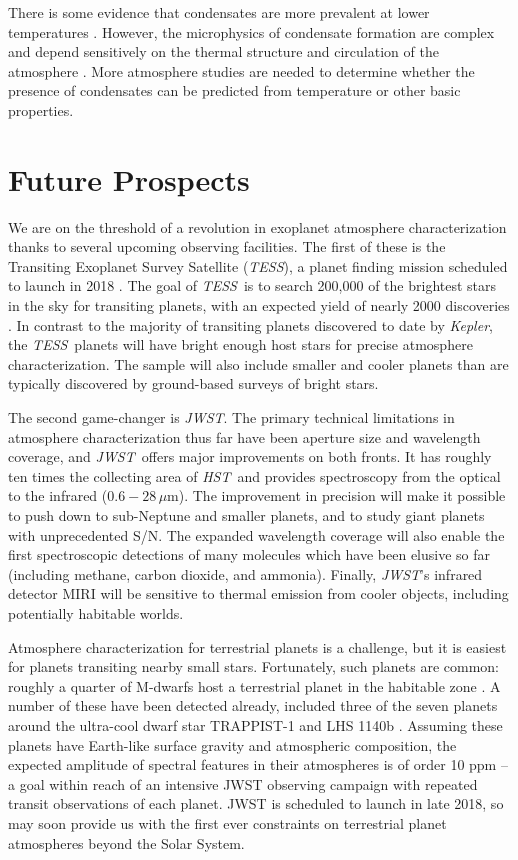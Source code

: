 \documentclass[graybox,natbib,nosecnum]{svmult}
\newcommand{\project}[1]{\textsl{#1}}
\newcommand{\JWST}{\project{JWST}}
\newcommand{\HST}{\project{HST}}
\newcommand{\TESS}{\project{TESS}}
\newcommand{\Kepler}{\project{Kepler}}
\begin{document}
There is some evidence that condensates are more prevalent at lower temperatures \citep{stevenson16, heng16}. However, the microphysics of condensate formation are complex and depend sensitively on the thermal structure and circulation of the atmosphere \citep{turco79}. More atmosphere studies are needed to determine whether the presence of condensates can be predicted from temperature or other basic properties.

\section{Future Prospects}
We are on the threshold of a revolution in exoplanet atmosphere characterization thanks to several upcoming observing facilities.  The first of these is the Transiting Exoplanet Survey Satellite (\TESS), a planet finding mission scheduled to launch in 2018 \citep{ricker14}.  The goal of \TESS\ is to search 200,000 of the brightest stars in the sky for transiting planets, with an expected yield of nearly 2000 discoveries \citep{sullivan15}. In contrast to the majority of transiting planets discovered to date by \Kepler, the \TESS\ planets will have bright enough host stars for precise atmosphere characterization. The sample will also include smaller and cooler planets than are typically discovered by ground-based surveys of bright stars. 

The second game-changer is \JWST. The primary technical limitations in atmosphere characterization thus far have been aperture size and wavelength coverage, and \JWST\ offers major improvements on both fronts. It has roughly ten times the collecting area of \HST\, and provides spectroscopy from the optical to the infrared ($0.6 - 28\,\mu$m). The improvement in precision will make it possible to push down to sub-Neptune and smaller planets, and to study giant planets with unprecedented S/N. The expanded wavelength coverage will also enable the first spectroscopic detections of many molecules which have been elusive so far (including methane, carbon dioxide, and ammonia). Finally, \JWST's infrared detector MIRI will be sensitive to thermal emission from cooler objects, including potentially habitable worlds.

Atmosphere characterization for terrestrial planets is a challenge, but it is easiest for planets transiting nearby small stars.  Fortunately, such planets are common: roughly a quarter of M-dwarfs host a terrestrial planet in the habitable zone \citep{dressing15}. A number of these have been detected already, included three of the seven planets around the ultra-cool dwarf star TRAPPIST-1 and LHS 1140b \citep{gillon17, dittmann17}. Assuming these planets have Earth-like surface gravity and atmospheric composition, the expected amplitude of spectral features in their atmospheres is of order 10 ppm -- a goal within reach of an intensive JWST observing campaign with repeated transit observations of each planet.  JWST is scheduled to launch in late 2018, so may soon provide us with the first ever constraints on terrestrial planet atmospheres beyond the Solar System. 
\end{document}
